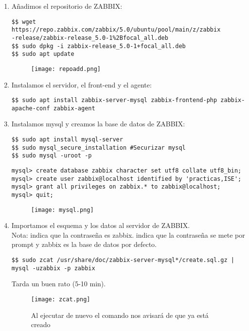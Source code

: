 \begin{enumerate}
	\item Añadimos el repositorio de ZABBIX:
\begin{verbatim}
$$ wget https://repo.zabbix.com/zabbix/5.0/ubuntu/pool/main/z/zabbix
-release/zabbix-release_5.0-1%2Bfocal_all.deb
$$ sudo dpkg -i zabbix-release_5.0-1+focal_all.deb
$$ sudo apt update
\end{verbatim}
\begin{figure}[H]
	\centering
	\texttt{[image: repoadd.png]} 
\end{figure}
	
	\item Instalamos el servidor, el front-end y el agente:
\begin{verbatim}
$$ sudo apt install zabbix-server-mysql zabbix-frontend-php zabbix-apache-conf zabbix-agent
\end{verbatim}

\item Instalamos mysql y creamos la base de datos de ZABBIX:
\begin{verbatim}
$$ sudo apt install mysql-server
$$ sudo mysql_secure_installation #Securizar mysql
$$ sudo mysql -uroot -p
\end{verbatim}

\begin{verbatim}
mysql> create database zabbix character set utf8 collate utf8_bin;
mysql> create user zabbix@localhost identified by 'practicas,ISE';
mysql> grant all privileges on zabbix.* to zabbix@localhost;
mysql> quit;
\end{verbatim}

\begin{figure}[H]
	\centering
	\texttt{[image: mysql.png]} 
\end{figure}

	\item Importamos el esquema y los datos al servidor de ZABBIX. \\
	Nota:  indica que la contraseña es zabbix.  indica que la contraseña se mete por prompt y zabbix es la base de datos por defecto.
	\begin{verbatim}
$$ sudo zcat /usr/share/doc/zabbix-server-mysql*/create.sql.gz | mysql -uzabbix -p zabbix
	\end{verbatim}
Tarda un buen rato (5-10 min).

\begin{figure}[H]
	\centering
	\texttt{[image: zcat.png]} 
	\caption{Al ejecutar de nuevo el comando nos avisará de que ya está creado}
\end{figure}


\end{enumerate}
